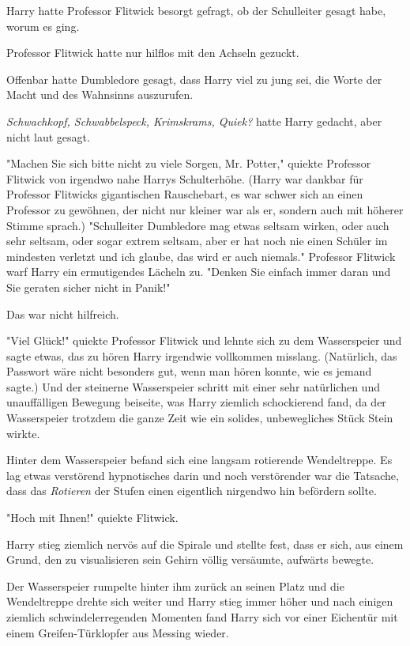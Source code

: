 {Harry hatte Professor Flitwick besorgt gefragt, ob der Schulleiter gesagt habe, worum es ging.

Professor Flitwick hatte nur hilflos mit den Achseln gezuckt.

Offenbar hatte Dumbledore gesagt, dass Harry viel zu jung sei, die Worte der Macht und des Wahnsinns auszurufen.

\emph{Schwachkopf, Schwabbelspeck, Krimskrams, Quiek?} hatte Harry gedacht, aber nicht laut gesagt.

"Machen Sie sich bitte nicht zu viele Sorgen, Mr. Potter," quiekte Professor Flitwick von irgendwo nahe Harrys Schulterhöhe. (Harry war dankbar für Professor Flitwicks gigantischen Rauschebart, es war schwer sich an einen Professor zu gewöhnen, der nicht nur kleiner war als er, sondern auch mit höherer Stimme sprach.) "Schulleiter Dumbledore mag etwas seltsam wirken, oder auch sehr seltsam, oder sogar extrem seltsam, aber er hat noch nie einen Schüler im mindesten verletzt und ich glaube, das wird er auch niemals." Professor Flitwick warf Harry ein ermutigendes Lächeln zu. "Denken Sie einfach immer daran und Sie geraten sicher nicht in Panik!"

Das war nicht hilfreich.

"Viel Glück!" quiekte Professor Flitwick und lehnte sich zu dem Wasserspeier und sagte etwas, das zu hören Harry irgendwie vollkommen misslang. (Natürlich, das Passwort wäre nicht besonders gut, wenn man hören konnte, wie es jemand sagte.) Und der steinerne Wasserspeier schritt mit einer sehr natürlichen und unauffälligen Bewegung beiseite, was Harry ziemlich schockierend fand, da der Wasserspeier trotzdem die ganze Zeit wie ein solides, unbewegliches Stück Stein wirkte.

Hinter dem Wasserspeier befand sich eine langsam rotierende Wendeltreppe. Es lag etwas verstörend hypnotisches darin und noch verstörender war die Tatsache, dass das \emph{Rotieren} der Stufen einen eigentlich nirgendwo hin befördern sollte.

"Hoch mit Ihnen!" quiekte Flitwick.

Harry stieg ziemlich nervös auf die Spirale und stellte fest, dass er sich, aus einem Grund, den zu visualisieren sein Gehirn völlig versäumte, aufwärts bewegte.

Der Wasserspeier rumpelte hinter ihm zurück an seinen Platz und die Wendeltreppe drehte sich weiter und Harry stieg immer höher und nach einigen ziemlich schwindelerregenden Momenten fand Harry sich vor einer Eichentür mit einem Greifen-Türklopfer aus Messing wieder.

}
